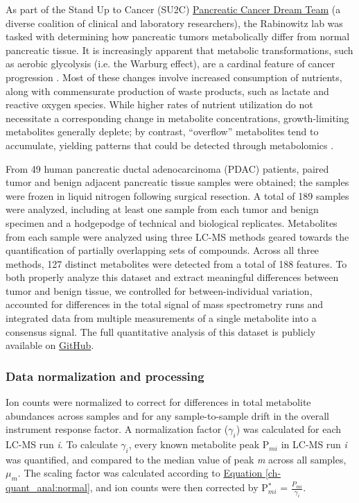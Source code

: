 As part of the Stand Up to Cancer (SU2C) \href{http://www.standup2cancer.org/dream_team_members#Pancreatic}{Pancreatic Cancer Dream Team} (a diverse coalition of clinical and laboratory researchers), the Rabinowitz lab was tasked with determining how pancreatic tumors metabolically differ from normal pancreatic tissue.  It is increasingly apparent that metabolic transformations, such as aerobic glycolysis (i.e. the Warburg effect), are a cardinal feature of cancer progression \cite{VanderHeiden:2009gq, Hanahan:2011gu}.  Most of these changes involve increased consumption of nutrients, along with commensurate production of waste products, such as lactate and reactive oxygen species.  While higher rates of nutrient utilization do not necessitate a corresponding change in metabolite concentrations, growth-limiting metabolites generally deplete; by contrast, ``overflow'' metabolites tend to accumulate, yielding patterns that could be detected through metabolomics \cite{Boer:2010fb}.

From 49 human pancreatic ductal adenocarcinoma (PDAC) patients, paired tumor and benign adjacent pancreatic tissue samples were obtained; the samples were frozen in liquid nitrogen following surgical resection.  A total of 189 samples were analyzed, including at least one sample from each tumor and benign specimen and a hodgepodge of technical and biological replicates.  Metabolites from each sample were analyzed using three LC-MS methods geared towards the quantification of partially overlapping sets of compounds. Across all three methods, 127 distinct metabolites were detected from a total of 188 features.  To both properly analyze this dataset and extract meaningful differences between tumor and benign tissue, we controlled for between-individual variation, accounted for differences in the total signal of mass spectrometry runs and integrated data from multiple measurements of a single metabolite into a consensus signal. The full quantitative analysis of this dataset is publicly available on \href{https://github.com/shackett/Pancreatic_tumor_metabolomics}{GitHub}.

\subsubsection{Data normalization and processing}

Ion counts were normalized to correct for differences in total metabolite abundances across samples and for any sample-to-sample drift in the overall instrument response factor.  A normalization factor ($\gamma_{i}$) was calculated for each LC-MS run \textit{i}.  To calculate $\gamma_{i}$, every known metabolite peak P$_{mi}$ in LC-MS run \textit{i} was quantified, and compared to the median value of peak \textit{m} across all samples, $\mu_{m}$.  The scaling factor was calculated according to \hyperref[ch-quant_anal:normal]{Equation \ref{ch-quant_anal:normal}}, and ion counts were then corrected by P$^{*}_{mi}$ = $\frac{P_{mi}}{\gamma_{i}}$.

